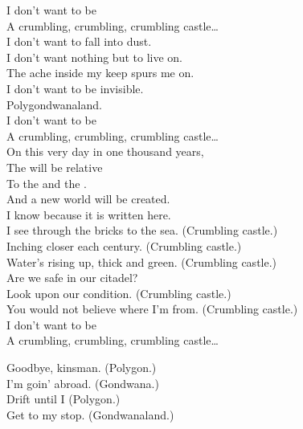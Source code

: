 I don't want to be \\
A crumbling, crumbling, crumbling castle… \\

I don't want to fall into dust. \\
I don't want nothing but to live on. \\
The ache inside my keep spurs me on. \\
I don't want to be invisible. \\
Polygondwanaland. \\

I don't want to be \\
A crumbling, crumbling, crumbling castle… \\

On this very day in one thousand years, \\
The  will be relative \\
To the  and the . \\
And a new world will be created. \\
I know because it is written here. \\

I see through the bricks to the sea. (Crumbling castle.) \\
Inching closer each century. (Crumbling castle.) \\
Water's rising up, thick and green. (Crumbling castle.) \\

Are we safe in our citadel? \\
Look upon our condition. (Crumbling castle.) \\
You would not believe where I'm from. (Crumbling castle.) \\

I don't want to be \\
A crumbling, crumbling, crumbling castle… \\





Goodbye, kinsman. (Polygon.) \\
I'm goin' abroad. (Gondwana.) \\
Drift until I (Polygon.) \\
Get to my stop. (Gondwanaland.) \\

